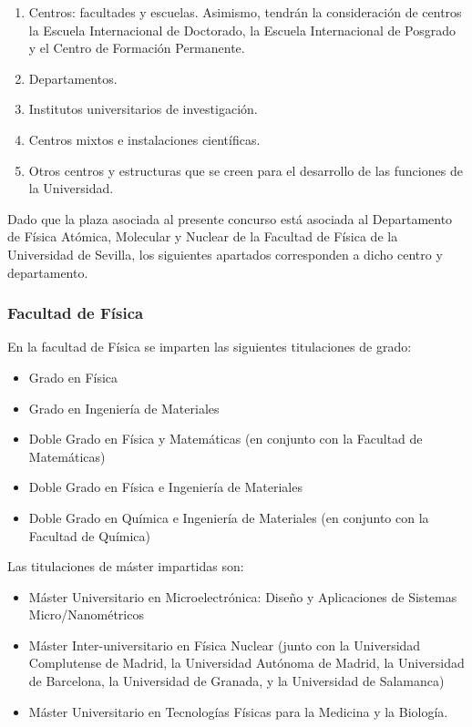 \documentclass[a4paper,12pt,twoside]{article}
\begin{document}
\begin{enumerate}[label=\alph*)]
\item Centros: facultades y escuelas. Asimismo, tendrán la consideración de centros la Escuela Internacional de Doctorado, la Escuela Internacional de Posgrado y el Centro de Formación Permanente.
\item Departamentos.
\item Institutos universitarios de investigación.
\item Centros mixtos e instalaciones científicas.
\item Otros centros y estructuras que se creen para el desarrollo de las funciones de la Universidad.
\end{enumerate}

Dado que la plaza asociada al presente concurso está asociada al Departamento de Física Atómica, Molecular y Nuclear de la Facultad de Física de la Universidad de Sevilla, los siguientes apartados corresponden a dicho centro y departamento.

\subsubsection{Facultad de Física}

En la facultad de Física se imparten las siguientes titulaciones de grado:
\begin{itemize}
\item Grado en Física
\item Grado en Ingeniería de Materiales
\item Doble Grado en Física y Matemáticas (en conjunto con la Facultad de Matemáticas)
\item Doble Grado en Física e Ingeniería de Materiales
\item Doble Grado en Química e Ingeniería de Materiales (en conjunto con la Facultad de Química)
\end{itemize} 

Las titulaciones de máster impartidas son:
\begin{itemize}
\item Máster Universitario en Microelectrónica: Diseño y Aplicaciones de Sistemas Micro/Nanométricos
\item Máster Inter-universitario en Física Nuclear (junto con la Universidad Complutense de Madrid, la Universidad Autónoma de Madrid, la Universidad de Barcelona, la Universidad de Granada, y la Universidad de Salamanca) 
\item Máster Universitario en Tecnologías Físicas para la Medicina y la Biología.
\end{itemize} 
\end{document}
